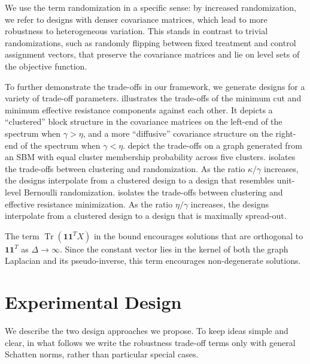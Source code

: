 \documentclass[12pt]{article}
\theoremstyle{definition}
\numberwithin{equation}{section}
\numberwithin{figure}{section}
\numberwithin{equation}{section}
\numberwithin{figure}{section}
\begin{document}
\begin{remark} \label{randomization_levels}
    We use the term randomization in a specific sense: by increased randomization, we refer to designs with denser covariance matrices, which lead to more robustness to heterogeneous variation. This stands in contrast to trivial randomizations, such as randomly flipping between fixed treatment and control assignment vectors, that preserve the covariance matrices and lie on level sets of the objective function. 
\end{remark}

To further demonstrate the trade-offs in our framework, we generate designs for a variety of trade-off parameters.  illustrates the trade-offs of the minimum cut and minimum effective resistance components against each other. It depicts a ``clustered'' block structure in the covariance matrices on the left-end of the spectrum when $\gamma > \eta$, and a more ``diffusive'' covariance structure on the right-end of the spectrum when $\gamma < \eta.$  depict the trade-offs on a graph generated from an SBM with equal cluster membership probability across five clusters.  isolates the trade-offs between clustering and randomization. As the ratio $\kappa/\gamma$ increases, the designs interpolate from a clustered design to a design that resembles unit-level Bernoulli randomization.  isolates the trade-offs between clustering and effective resistance minimization. As the ratio $\eta/\gamma$ increases, the designs interpolate from a clustered design to a design that is maximally spread-out.

\begin{remark}
The term $\operatorname{Tr}(\mathbf{1}\mathbf{1}^TX)$ in the bound encourages solutions that are orthogonal to $\mathbf{1}\mathbf{1}^T$ as $\Delta \to \infty$. Since the constant vector lies in the kernel of both the graph Laplacian and its pseudo-inverse, this term encourages non-degenerate solutions.
\end{remark}


\section{Experimental Design}
We describe the two design approaches we propose. To keep ideas simple and clear, in what follows we write the robustness trade-off terms only with general Schatten norms, rather than particular special cases.
\end{document}

